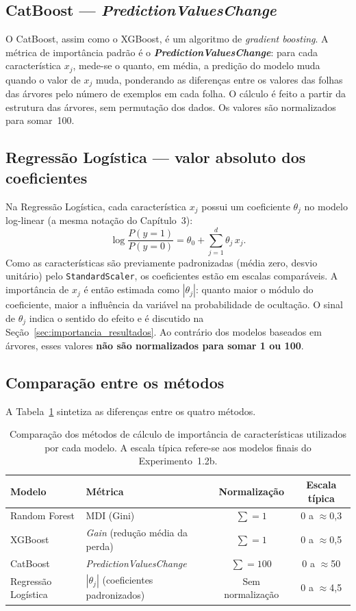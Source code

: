 \subsection{CatBoost --- \textit{PredictionValuesChange}}

O CatBoost, assim como o XGBoost, é um algoritmo de \textit{gradient boosting}. A métrica de importância padrão é o \textbf{\textit{PredictionValuesChange}}: para cada característica $x_j$, mede-se o quanto, em média, a predição do modelo muda quando o valor de $x_j$ muda, ponderando as diferenças entre os valores das folhas das árvores pelo número de exemplos em cada folha. O cálculo é feito a partir da estrutura das árvores, sem permutação dos dados. Os valores são normalizados para somar~100.

\subsection{Regressão Logística --- valor absoluto dos coeficientes}

Na Regressão Logística, cada característica $x_j$ possui um coeficiente $\theta_j$ no modelo log-linear (a mesma notação do Capítulo~3):
%
\[
\log\frac{P(y=1)}{P(y=0)} = \theta_0 + \sum_{j=1}^{d} \theta_j\,x_j.
\]
%
Como as características são previamente padronizadas (média zero, desvio unitário) pelo \texttt{StandardScaler}, os coeficientes estão em escalas comparáveis. A importância de $x_j$ é então estimada como $|\theta_j|$: quanto maior o módulo do coeficiente, maior a influência da variável na probabilidade de ocultação. O sinal de $\theta_j$ indica o sentido do efeito e é discutido na Seção~\ref{sec:importancia_resultados}. Ao contrário dos modelos baseados em árvores, esses valores \textbf{não são normalizados para somar 1 ou 100}.

\subsection{Comparação entre os métodos}

A Tabela~\ref{tab:metodos_importancia} sintetiza as diferenças entre os quatro métodos.

\begin{table}[htbp]
\centering
\caption{Comparação dos métodos de cálculo de importância de características utilizados por cada modelo. A escala típica refere-se aos modelos finais do Experimento~1.2b.}
\label{tab:metodos_importancia}
\footnotesize
\begin{tabular}{llcc}
\hline
\textbf{Modelo} & \textbf{Métrica} & \textbf{Normalização} & \textbf{Escala típica} \\
\hline
Random Forest & MDI (Gini) & $\sum = 1$ & 0 a $\approx$0,3 \\
XGBoost & \textit{Gain} (redução média da perda) & $\sum = 1$ & 0 a $\approx$0,5 \\
CatBoost & \textit{PredictionValuesChange} & $\sum = 100$ & 0 a $\approx$50 \\
Regressão Logística & $|\theta_j|$ (coeficientes padronizados) & Sem normalização & 0 a $\approx$4,5 \\
\hline
\end{tabular}
\end{table}

